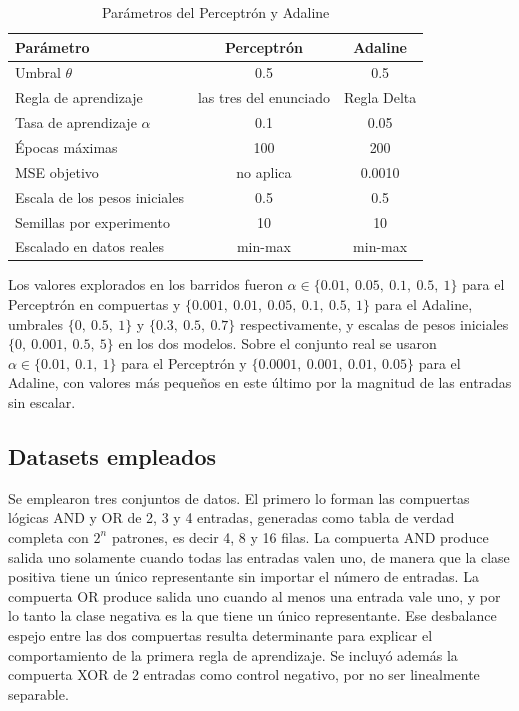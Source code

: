 \documentclass[11pt,letterpaper]{article}
\begin{document}
\begin{table}[!htb]
    \centering
    \small
    \caption{Parámetros del Perceptrón y Adaline}
    \label{tab:param}
    \begin{tabular}{lcc}
        \toprule
        \textbf{Parámetro} & \textbf{Perceptrón} & \textbf{Adaline} \\
        \midrule
        Umbral $\theta$                & 0.5 & 0.5 \\
        Regla de aprendizaje           & las tres del enunciado & Regla Delta \\
        Tasa de aprendizaje $\alpha$   & 0.1 & 0.05 \\
        Épocas máximas                 & 100 & 200 \\
        MSE objetivo                   & no aplica & 0.0010 \\
        Escala de los pesos iniciales  & 0.5 & 0.5 \\
        Semillas por experimento       & 10 & 10 \\
        Escalado en datos reales       & min-max & min-max \\
        \bottomrule
    \end{tabular}
\end{table}

Los valores explorados en los barridos fueron $\alpha \in \{0.01,\ 0.05,\ 0.1,\ 0.5,\ 1\}$ para el Perceptrón en compuertas y $\{0.001,\ 0.01,\ 0.05,\ 0.1,\ 0.5,\ 1\}$ para el Adaline, umbrales $\{0,\ 0.5,\ 1\}$ y $\{0.3,\ 0.5,\ 0.7\}$ respectivamente, y escalas de pesos iniciales $\{0,\ 0.001,\ 0.5,\ 5\}$ en los dos modelos. Sobre el conjunto real se usaron $\alpha \in \{0.01,\ 0.1,\ 1\}$ para el Perceptrón y $\{0.0001,\ 0.001,\ 0.01,\ 0.05\}$ para el Adaline, con valores más pequeños en este último por la magnitud de las entradas sin escalar.

\subsection{Datasets empleados}

Se emplearon tres conjuntos de datos. El primero lo forman las compuertas lógicas AND y OR de 2, 3 y 4 entradas, generadas como tabla de verdad completa con $2^n$ patrones, es decir 4, 8 y 16 filas. La compuerta AND produce salida uno solamente cuando todas las entradas valen uno, de manera que la clase positiva tiene un único representante sin importar el número de entradas. La compuerta OR produce salida uno cuando al menos una entrada vale uno, y por lo tanto la clase negativa es la que tiene un único representante. Ese desbalance espejo entre las dos compuertas resulta determinante para explicar el comportamiento de la primera regla de aprendizaje. Se incluyó además la compuerta XOR de 2 entradas como control negativo, por no ser linealmente separable.
\end{document}
